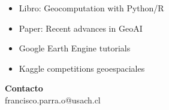 \documentclass[11pt,a4paper]{article}
\begin{document}
\begin{itemize}[leftmargin=*]
    \item Libro: Geocomputation with Python/R
    \item Paper: Recent advances in GeoAI
    \item Google Earth Engine tutorials
    \item Kaggle competitions geoespaciales
\end{itemize}


\vspace{0.5cm}

\begin{tcolorbox}[colback=gray!10,colframe=gray!50]
\centering
\textbf{Contacto}\\[0.2cm]
 francisco.parra.o@usach.cl
\end{tcolorbox}
\end{document}
